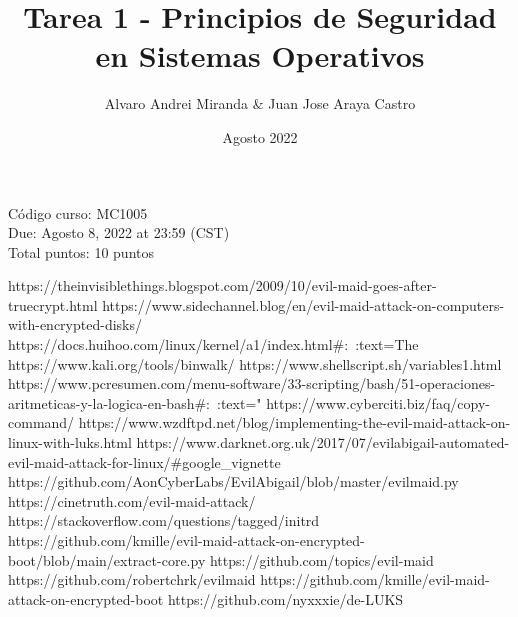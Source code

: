\documentclass{article}
\title{Tarea 1 - Principios de Seguridad en Sistemas Operativos}
\author{Alvaro Andrei Miranda & Juan Jose Araya Castro}
\date{Agosto 2022}
\begin{document}
\maketitle

\begin{minipage}{\textwidth}
Código curso: MC1005\\
Due: Agosto 8, 2022 at 23:59 (CST)\\
Total puntos: 10 puntos\\
\end{minipage}


https://theinvisiblethings.blogspot.com/2009/10/evil-maid-goes-after-truecrypt.html
https://www.sidechannel.blog/en/evil-maid-attack-on-computers-with-encrypted-disks/
https://docs.huihoo.com/linux/kernel/a1/index.html#:~:text=The%
https://www.kali.org/tools/binwalk/
https://www.shellscript.sh/variables1.html
https://www.pcresumen.com/menu-software/33-scripting/bash/51-operaciones-aritmeticas-y-la-logica-en-bash#:~:text="%
https://www.cyberciti.biz/faq/copy-command/
https://www.wzdftpd.net/blog/implementing-the-evil-maid-attack-on-linux-with-luks.html
https://www.darknet.org.uk/2017/07/evilabigail-automated-evil-maid-attack-for-linux/#google_vignette
https://github.com/AonCyberLabs/EvilAbigail/blob/master/evilmaid.py
https://cinetruth.com/evil-maid-attack/
https://stackoverflow.com/questions/tagged/initrd
https://github.com/kmille/evil-maid-attack-on-encrypted-boot/blob/main/extract-core.py
https://github.com/topics/evil-maid
https://github.com/robertchrk/evilmaid
https://github.com/kmille/evil-maid-attack-on-encrypted-boot
https://github.com/nyxxxie/de-LUKS


    
    
\end{document}
